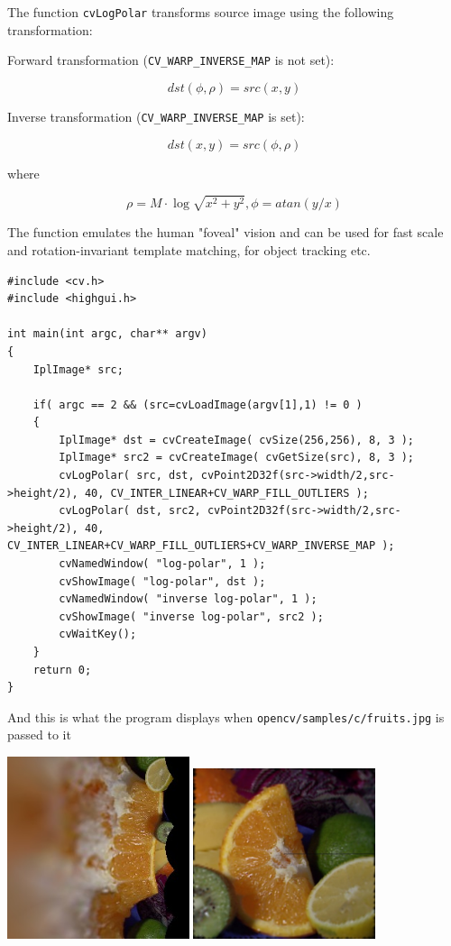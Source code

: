 The function \texttt{cvLogPolar} transforms source image using the following transformation:

Forward transformation (\texttt{CV\_WARP\_INVERSE\_MAP} is not set):

\[
dst(\phi,\rho) = src(x,y)
\]

Inverse transformation (\texttt{CV\_WARP\_INVERSE\_MAP} is set):

\[
dst(x,y) = src(\phi,\rho)
\]

where

\[
\rho = M \cdot \log{\sqrt{x^2 + y^2}},
\phi=atan(y/x)
\]

The function emulates the human "foveal" vision and can be used for fast scale and rotation-invariant template matching, for object tracking etc.

\begin{lstlisting}
#include <cv.h>
#include <highgui.h>

int main(int argc, char** argv)
{
    IplImage* src;

    if( argc == 2 && (src=cvLoadImage(argv[1],1) != 0 )
    {
        IplImage* dst = cvCreateImage( cvSize(256,256), 8, 3 );
        IplImage* src2 = cvCreateImage( cvGetSize(src), 8, 3 );
        cvLogPolar( src, dst, cvPoint2D32f(src->width/2,src->height/2), 40, CV_INTER_LINEAR+CV_WARP_FILL_OUTLIERS );
        cvLogPolar( dst, src2, cvPoint2D32f(src->width/2,src->height/2), 40, CV_INTER_LINEAR+CV_WARP_FILL_OUTLIERS+CV_WARP_INVERSE_MAP );
        cvNamedWindow( "log-polar", 1 );
        cvShowImage( "log-polar", dst );
        cvNamedWindow( "inverse log-polar", 1 );
        cvShowImage( "inverse log-polar", src2 );
        cvWaitKey();
    }
    return 0;
}
\end{lstlisting}

And this is what the program displays when \texttt{opencv/samples/c/fruits.jpg} is passed to it

\includegraphics[width=0.4\textwidth]{pics/logpolar.jpg}
\includegraphics[width=0.4\textwidth]{pics/inv_logpolar.jpg}

